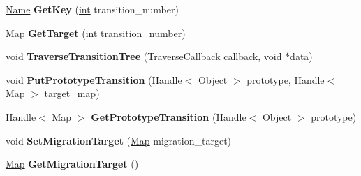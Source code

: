 \begin{DoxyCompactItemize}
\mbox{\hyperlink{classv8_1_1internal_1_1Name}{Name}} {\bfseries Get\+Key} (\mbox{\hyperlink{classint}{int}} transition\+\_\+number)
\item 
\mbox{\label{classv8_1_1internal_1_1TransitionsAccessor_a4fad05075e01125d241d27efbb7eafdd}} 
\mbox{\hyperlink{classv8_1_1internal_1_1Map}{Map}} {\bfseries Get\+Target} (\mbox{\hyperlink{classint}{int}} transition\+\_\+number)
\item 
\mbox{\label{classv8_1_1internal_1_1TransitionsAccessor_ac83a3d836e92cfdac0e6174ba803e604}} 
void {\bfseries Traverse\+Transition\+Tree} (Traverse\+Callback callback, void $\ast$data)
\item 
\mbox{\label{classv8_1_1internal_1_1TransitionsAccessor_a3fa9f9ec480f36dc2525b29ffa32c4a2}} 
void {\bfseries Put\+Prototype\+Transition} (\mbox{\hyperlink{classv8_1_1internal_1_1Handle}{Handle}}$<$ \mbox{\hyperlink{classv8_1_1internal_1_1Object}{Object}} $>$ prototype, \mbox{\hyperlink{classv8_1_1internal_1_1Handle}{Handle}}$<$ \mbox{\hyperlink{classv8_1_1internal_1_1Map}{Map}} $>$ target\+\_\+map)
\item 
\mbox{\label{classv8_1_1internal_1_1TransitionsAccessor_a60a6e909beb1a83adf0a1938f80bd776}} 
\mbox{\hyperlink{classv8_1_1internal_1_1Handle}{Handle}}$<$ \mbox{\hyperlink{classv8_1_1internal_1_1Map}{Map}} $>$ {\bfseries Get\+Prototype\+Transition} (\mbox{\hyperlink{classv8_1_1internal_1_1Handle}{Handle}}$<$ \mbox{\hyperlink{classv8_1_1internal_1_1Object}{Object}} $>$ prototype)
\item 
\mbox{\label{classv8_1_1internal_1_1TransitionsAccessor_a082aa2c4223d6d1f855d0a22c6bc3100}} 
void {\bfseries Set\+Migration\+Target} (\mbox{\hyperlink{classv8_1_1internal_1_1Map}{Map}} migration\+\_\+target)
\item 
\mbox{\label{classv8_1_1internal_1_1TransitionsAccessor_ada2cff8b2040b477efa1444280fea40b}} 
\mbox{\hyperlink{classv8_1_1internal_1_1Map}{Map}} {\bfseries Get\+Migration\+Target} ()
\end{DoxyCompactItemize}
